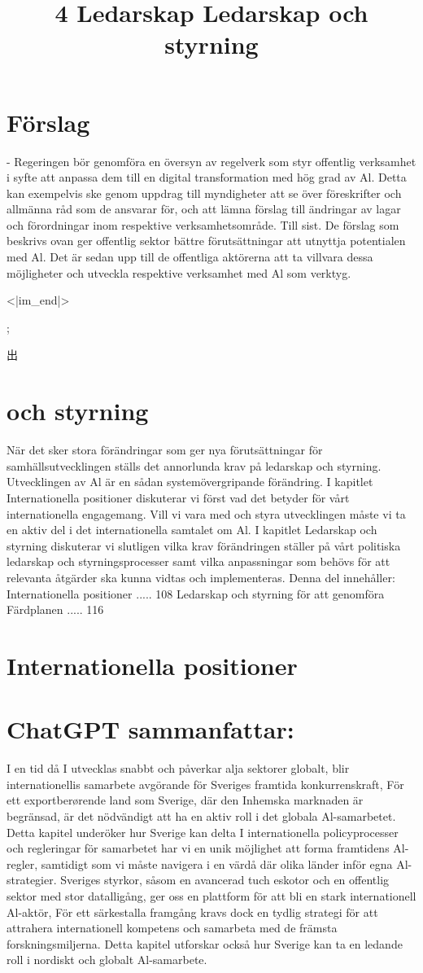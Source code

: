 {{{{{{{{{{{{{{{{\section*{Förslag}
- Regeringen bör genomföra en översyn av regelverk som styr offentlig verksamhet i syfte att anpassa dem till en digital transformation med hög grad av Al. Detta kan exempelvis ske genom uppdrag till myndigheter att se över föreskrifter och allmänna råd som de ansvarar för, och att lämna förslag till ändringar av lagar och förordningar inom respektive verksamhetsområde.
Till sist. De förslag som beskrivs ovan ger offentlig sektor bättre förutsättningar att utnyttja potentialen med Al. Det är sedan upp till de offentliga aktörerna att ta villvara dessa möjligheter och utveckla respektive verksamhet med Al som verktyg.

<|im_end|>};

出

\title{
4 Ledarskap
}
\section*{och styrning}
När det sker stora förändringar som ger nya förutsättningar för samhällsutvecklingen ställs det annorlunda krav på ledarskap och styrning. Utvecklingen av Al är en sådan systemövergripande förändring. I kapitlet Internationella positioner diskuterar vi först vad det betyder för vårt internationella engagemang. Vill vi vara med och styra utvecklingen måste vi ta en aktiv del i det internationella samtalet om Al.
I kapitlet Ledarskap och styrning diskuterar vi slutligen vilka krav förändringen ställer på vårt politiska ledarskap och styrningsprocesser samt vilka anpassningar som behövs för att relevanta åtgärder ska kunna vidtas och implementeras.
Denna del innehåller:
Internationella positioner ..... 108
Ledarskap och styrning för att genomföra Färdplanen ..... 116

\title{
Ledarskap och styrning
}
\section*{Internationella positioner}
\section*{ChatGPT sammanfattar:}
I en tid då I utvecklas snabbt och påverkar alja sektorer globalt, blir internationellis samarbete avgörande för Sveriges framtida konkurrenskraft, För ett exportberørende land som Sverige, där den Inhemska marknaden är begränsad, är det nödvändigt att ha en aktiv roll i det globala Al-samarbetet.
Detta kapitel underöker hur Sverige kan delta I internationella policyprocesser och regleringar för samarbetet har vi en unik möjlighet att forma framtidens Al-regler, samtidigt som vi måste navigera i en värdå där olika länder inför egna Al-strategier. Sveriges styrkor, såsom en avancerad tuch eskotor och en offentlig sektor med stor datalligång, ger oss en plattform för att bli en stark internationell Al-aktör, För ett särkestalla framgång kravs dock en tydlig strategi för att attrahera internationell kompetens och samarbeta med de främsta forskningsmiljerna. Detta kapitel utforskar också hur Sverige kan ta en ledande roll i nordiskt och globalt Al-samarbete.
}}}}}}}}}}}}}}}
